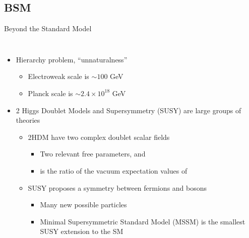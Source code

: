 \documentclass[aspectratio=169,xcolor=table]{beamer}
\begin{document}
  \subsection{BSM }

    \begin{frame}[t]{Beyond the Standard Model}
      \begin{columns}
        \begin{itemize}
          \item Hierarchy problem, ``unnaturalness''
          \begin{itemize}
            \item Electroweak scale is $\sim 100$ GeV
            \item Planck scale is $\sim 2.4 \times 10^{18}$ GeV
          \end{itemize}
          \item 2 Higgs Doublet Models and Supersymmetry (SUSY) are large groups of theories
          \begin{itemize}
            \item 2HDM have two complex doublet scalar fields \tiny{\cite{2HDM}}
            \begin{itemize}
              \item Two relevant free parameters, \tanb and \mHpm
              \item \tanb is the ratio of the vacuum expectation values of \Hpm
            \end{itemize}
            \item SUSY proposes a symmetry between fermions and bosons
              \begin{itemize}
                \item Many new possible particles
                \item Minimal Supersymmetric Standard Model (MSSM) is the smallest SUSY extension to the SM

\end{itemize}
\end{itemize}
\end{itemize}
\end{columns}
\end{frame}
\end{document}
